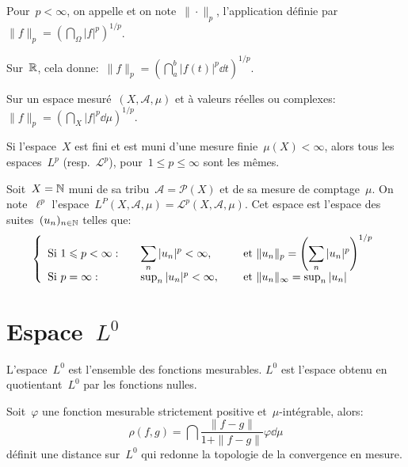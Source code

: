 \medskip
\begin{definition}[Norme~$L^p$]
Pour~$p<\infty$, on appelle  et on note~$\|\cdot\|_p$,
l'application définie par~$\|f\|_p=\left(\dint_\Omega |f|^p\right)^{1/p}$.
\end{definition}

Sur~$\mathbb R$, cela donne:~$\|f\|_p=\left(\dint_a^b |f(t)|^p\dd t\right)^{1/p}$.

Sur un espace mesuré~$(X, \mathcal{A}, \mu)$ et à valeurs réelles ou complexes:~$\|f\|_p=\left(\dint_X |f|^p\dd\mu\right)^{1/p}$.

\medskip
\begin{theoreme}
Si l'espace~$X$ est fini et est muni d'une mesure finie~$\mu(X)<\infty$, alors tous les espaces~$L^p$
(resp.~$\mathcal{L}^p$), pour~$1\le p\le \infty$ sont les mêmes.
\end{theoreme}

\begin{definition}
Soit~$X=\mathbb N$ muni de sa tribu~$\mathcal{A}=\mathcal{P}(X)$ et de sa mesure de comptage~$\mu$.
On note~$\ell^p$ l'espace~$L^P(X,\mathcal{A},\mu)=\mathcal{L}^p(X,\mathcal{A},\mu)$.
Cet espace est l'espace des suites~$(u_n)_{n\in\mathbb N}$ telles que:
\begin{equation}
\left\{
\begin{array}{lll}
\text{Si } 1\leqslant p<\infty: &\quad \displaystyle\sum_n |u_n|^p<\infty, &\quad \text{ et } \|u_n\|_p=\left(\displaystyle\sum_n|u_n|^p\right)^{1/p}\\
\text{Si } p=\infty: &\quad \sup_n |u_n|^p<\infty, &\quad \text{ et } \|u_n\|_\infty=\sup_n|u_n|
\end{array}
\right.
\end{equation}
\end{definition}

\medskip
\section{Espace~$L^0$}
L'espace~$L^0$ est l'ensemble des fonctions mesurables.
$L^0$ est l'espace obtenu en quotientant~$L^0$ par les fonctions nulles.

\medskip
Soit~$\varphi$ une fonction mesurable strictement positive et~$\mu$-intégrable, alors:
\begin{equation}
\rho(f,g)=\dint \frac{\|f-g\|}{1+\|f-g\|} \varphi \dd\mu
\end{equation}
définit une distance sur~$L^0$ qui redonne la topologie de la convergence en mesure.

